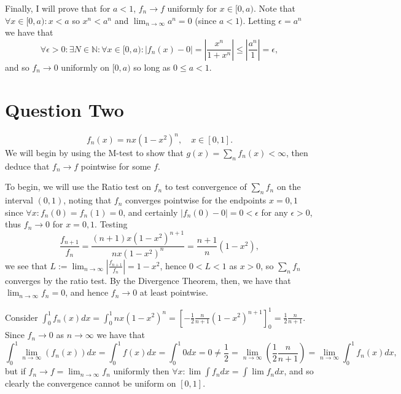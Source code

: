 \documentclass{article}
\def \N {\mathbb{N}}
\begin{document}
Finally, I will prove that for $a<1$, $f_n\to f$ uniformly for $x\in[0,a)$. Note that $\forall x\in[0,a): x<a$ so $x^n < a^n$ and $\lim_{n\to\infty}a^n = 0$ (since $a<1$). Letting $\epsilon=a^n$ we have that
	\[
		\forall \epsilon>0: \exists N\in\N: \forall x\in[0,a):
		|f_n(x)-0| = \left|\frac{x^n}{1+x^n}\right| \leq \left|\frac{a^n}{1}\right| = \epsilon,
	\]
and so $f_n\to 0$ uniformly on $[0,a)$ so long as $0\leq a<1$.


\section*{Question Two}
	\begin{equation}\label{eqn:q2}
		f_n(x) = nx(1-x^2)^n, \quad x\in[0,1].
	\end{equation}
We will begin by using the M-test to show that $g(x)=\sum_n f_n(x) < \infty$, then deduce that $f_n\to f$ pointwise for some $f$.

To begin, we will use the Ratio test on $f_n$ to test convergence of $\sum_n f_n$ on the interval $(0,1)$, noting that $f_n$ converges pointwise for the endpoints $x=0,1$ since $\forall x: f_n(0)=f_n(1)=0$, and certainly $|f_n(0)-0|=0<\epsilon$ for any $\epsilon>0$, thus $f_n\to0$ for $x=0,1$. Testing
	\[
		\frac{f_{n+1}}{f_n} = \frac{(n+1)x(1-x^2)^{n+1}}{nx(1-x^2)^n} = \frac{n+1}{n}(1-x^2),
	\]
we see that $L:=\lim_{n\to\infty}\left|\frac{f_{n+1}}{f_n}\right| = 1-x^2$, hence $0<L<1$ as $x>0$, so $\sum_n f_n$ converges by the ratio test. By the Divergence Theorem, then, we have that $\lim_{n\to\infty}f_n = 0$, and hence $f_n\to0$ at least pointwise.

Consider $\int_0^1 f_n(x)dx = \int_0^1 nx(1-x^2)^n = \left[-\frac12\frac{n}{n+1}(1-x^2)^{n+1}\right]_0^1 = \frac12\frac{n}{n+1}$. Since $f_n\to0$ as $n\to\infty$ we have that
	\[
		\int_0^1 \lim_{n\to\infty}(f_n(x))dx = \int_0^1 f(x)dx = \int_0^1 0 dx = 0 
		\neq 
		\frac12 = \lim_{n\to\infty}\left(\frac12\frac{n}{n+1}\right) 
		= \lim_{n\to\infty}\int_0^1 f_n(x)dx,
	\]
but if $f_n\to f=\lim_{n\to\infty}f_n$ uniformly then $\forall x: \lim\int f_n dx = \int\lim f_n dx$, and so clearly the convergence cannot be uniform on $[0,1]$.
\end{document}
